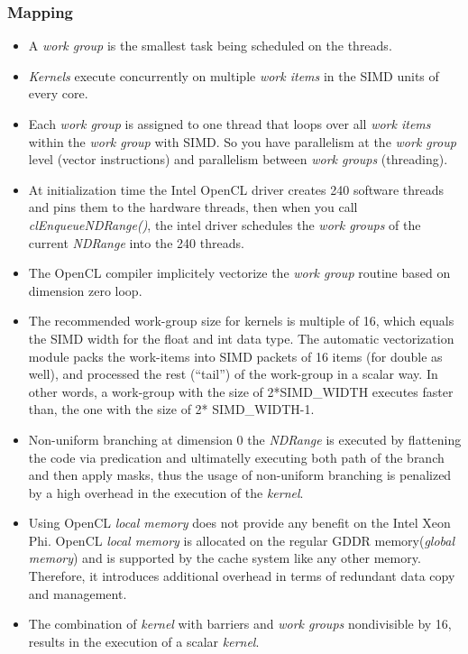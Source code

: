 \subsubsection{Mapping}
\begin{itemize}
    \item A \emph{work group} is the smallest task being scheduled on the threads\cite{opencl_phi}.
    \item \emph{Kernels} execute concurrently on multiple \emph{work items} in the SIMD units of every core\cite{opencl_phi_opt}.
    \item Each \emph{work group} is assigned to one thread that loops over all \emph{work items} within the \emph{work group} 
        with SIMD. So you have parallelism at the \emph{work group} level (vector instructions) and parallelism between 
        \emph{work groups} (threading)\cite{opencl_phi_opt}.
    \item At initialization time the Intel OpenCL driver creates 240 software threads and pins them to the hardware threads, then
        when you call \emph{clEnqueueNDRange()}, the intel driver schedules the \emph{work groups} of the current \emph{NDRange}
        into the 240 threads\cite{opencl_phi}.
    \item The OpenCL compiler implicitely vectorize the \emph{work group} routine based on dimension zero loop.
    \item The recommended work-group size for kernels is multiple of 16, which equals the SIMD width for the float and int data 
        type. The automatic vectorization module packs the work-items into SIMD packets of 16 items (for double as well), and 
        processed the rest (“tail”) of the work-group in a scalar way. In other words, a work-group with the size of 2*SIMD\_WIDTH 
        executes faster than, the one with the size of 2* SIMD\_WIDTH-1\cite{opencl_phi_opt,opencl_phi}.
    \item Non-uniform branching at dimension 0 the \emph{NDRange} is executed by flattening the code via predication and 
        ultimatelly executing both path of the branch and then apply masks, thus the usage of non-uniform branching is penalized by 
        a high overhead in the execution of the \emph{kernel}\cite{opencl_phi}.
    \item Using OpenCL \emph{local memory} does not provide any benefit on the Intel Xeon Phi. OpenCL \emph{local memory} is 
        allocated on the regular GDDR memory(\emph{global memory}) and is supported by the cache system like any other memory. 
        Therefore, it introduces additional overhead in terms of redundant data copy and management\cite{opencl_phi}.
    \item The combination of \emph{kernel} with barriers and \emph{work groups} nondivisible by 16, results in the execution of a
        scalar \emph{kernel}.
\end{itemize}

